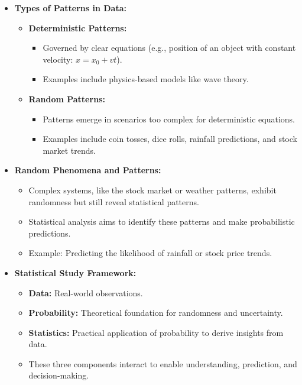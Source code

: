 \documentclass{article}
\begin{document}
\begin{itemize}
  \item \textbf{Types of Patterns in Data:}
    \begin{itemize}
      \item \textbf{Deterministic Patterns:}
        \begin{itemize}
          \item Governed by clear equations (e.g., position of an object with constant velocity: $x = x_0 + vt$).
          \item Examples include physics-based models like wave theory.
        \end{itemize}
      \item \textbf{Random Patterns:}
        \begin{itemize}
          \item Patterns emerge in scenarios too complex for deterministic equations.
          \item Examples include coin tosses, dice rolls, rainfall predictions, and stock market trends.
        \end{itemize}
    \end{itemize}

  \item \textbf{Random Phenomena and Patterns:}
    \begin{itemize}
      \item Complex systems, like the stock market or weather patterns, exhibit randomness but still reveal statistical patterns.
      \item Statistical analysis aims to identify these patterns and make probabilistic predictions.
      \item Example: Predicting the likelihood of rainfall or stock price trends.
    \end{itemize}

  \item \textbf{Statistical Study Framework:}
    \begin{itemize}
      \item \textbf{Data:} Real-world observations.
      \item \textbf{Probability:} Theoretical foundation for randomness and uncertainty.
      \item \textbf{Statistics:} Practical application of probability to derive insights from data.
      \item These three components interact to enable understanding, prediction, and decision-making.
    \end{itemize}


\end{itemize}
\end{document}
